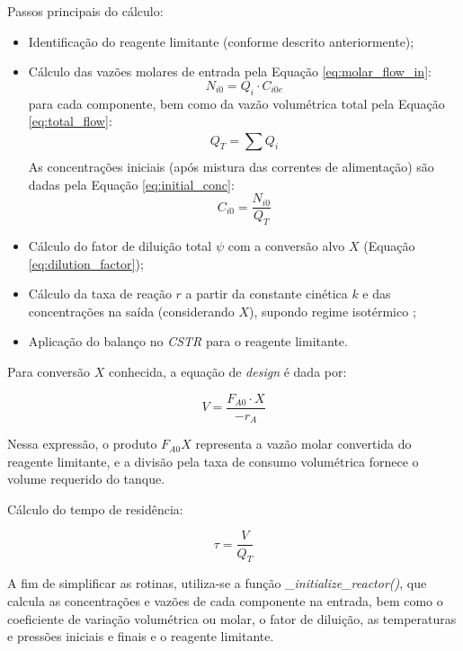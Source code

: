 Passos principais do cálculo:
\begin{itemize}
    \item Identificação do reagente limitante (conforme descrito anteriormente);
    \item Cálculo das vazões molares de entrada pela Equação \ref{eq:molar_flow_in}:
    \begin{equation}
    N_{i 0} = Q_{i} \cdot C_{i 0 e}
    \label{eq:molar_flow_in}
    \end{equation}
    para cada componente, bem como da vazão volumétrica total pela Equação \ref{eq:total_flow}:
    \begin{equation}
    Q_{T} = \sum_{}^{} Q_{i}
    \label{eq:total_flow}
    \end{equation}
    As concentrações iniciais (após mistura das correntes de alimentação) são dadas pela Equação \ref{eq:initial_conc}:
    \begin{equation}
    C_{i 0} = \frac{N_{i 0}}{Q_{T}}
    \label{eq:initial_conc}
    \end{equation}
    \item Cálculo do fator de diluição total $\psi$ com a conversão alvo $X$ (Equação \ref{eq:dilution_factor});
    \item Cálculo da taxa de reação $r$ a partir da constante cinética $k$ e das concentrações na saída (considerando $X$), supondo regime isotérmico \cite{fogler2009};
    \item Aplicação do balanço no \textit{CSTR} para o reagente limitante.
\end{itemize}

Para conversão $X$ conhecida, a equação de \textit{design} é dada por:

\begin{equation}
V = \frac{F_{A 0} \cdot X}{- r_{A}}
\label{eq:cstr_design}
\end{equation}

Nessa expressão, o produto $F_{A0}X$ representa a vazão molar convertida do reagente limitante, e a divisão pela taxa de consumo volumétrica fornece o volume requerido do tanque.

Cálculo do tempo de residência:

\begin{equation}
\tau = \frac{V}{Q_{T}}
\label{eq:residence_time}
\end{equation}

A fim de simplificar as rotinas, utiliza-se a função \textit{\_initialize\_reactor()}, que calcula as concentrações e vazões de cada componente na entrada, bem como o coeficiente de variação volumétrica ou molar, o fator de diluição, as temperaturas e pressões iniciais e finais e o reagente limitante.

